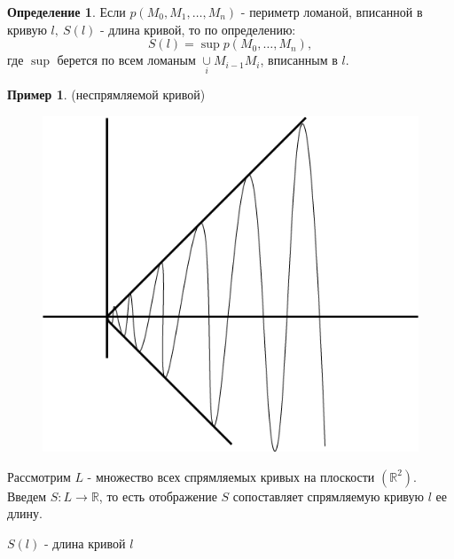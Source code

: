 \documentclass{report}
\theoremstyle{definition}
\newtheorem{definition}{Определение}[section]
\newtheorem{example}{Пример}
\begin{document}
\begin{definition}
  Если $p(M_0,M_1,\ldots,M_n)$ - периметр ломаной, вписанной в кривую $l, \ S(l)$ - длина кривой, то
  по определению:
  \begin{equation*}
    S(l) = \sup p(M_0,\ldots,M_n),
  \end{equation*}
  где $\sup$ берется по всем ломаным $\underset{i}{\cup} M_{i-1}M_i$, вписанным в $l$.
\end{definition}

\begin{example}
  (неспрямляемой кривой)

  \begin{figure}[H]
    \begin{center}
      \includegraphics[scale=0.2]{graph11.png}\label{figure11}
    \end{center}
  \end{figure}
\end{example}

Рассмотрим $L$ - множество всех спрямляемых кривых на плоскости $(\mathbb{R}^2)$.
Введем $S:L\rightarrow\mathbb{R}$, то есть отображение $S$ сопоставляет спрямляемую кривую $l$
ее длину.
\begin{center}
  $S(l)$ - длина кривой $l$
\end{center}
\end{document}
